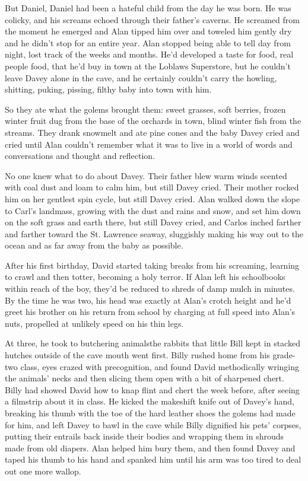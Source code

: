 But Daniel, Daniel had been a hateful child from the day he was born. 
He was colicky, and his screams echoed through their father's caverns. 
He screamed from the moment he emerged and Alan tipped him over and
toweled him gently dry and he didn't stop for an entire year.  Alan
stopped being able to tell day from night, lost track of the weeks and
months.  He'd developed a taste for food, real people food, that he'd
buy in town at the Loblaws Superstore, but he couldn't leave Davey
alone in the cave, and he certainly couldn't carry the howling,
shitting, puking, pissing, filthy baby into town with him.

So they ate what the golems brought them:  sweet grasses, soft
berries, frozen winter fruit dug from the base of the orchards in
town, blind winter fish from the streams.  They drank snowmelt and ate
pine cones and the baby Davey cried and cried until Alan couldn't
remember what it was to live in a world of words and conversations and
thought and reflection.

No one knew what to do about Davey.  Their father blew warm winds
scented with coal dust and loam to calm him, but still Davey cried. 
Their mother rocked him on her gentlest spin cycle, but still Davey
cried.  Alan walked down the slope to Carl's landmass, growing with
the dust and rains and snow, and set him down on the soft grass and
earth there, but still Davey cried, and Carlos inched farther and
farther toward the St.  Lawrence seaway, sluggishly making his way out
to the ocean and as far away from the baby as possible.

After his first birthday, David started taking breaks from his
screaming, learning to crawl and then totter, becoming a holy terror. 
If Alan left his schoolbooks within reach of the boy, they'd be
reduced to shreds of damp mulch in minutes.  By the time he was two,
his head was exactly at Alan's crotch height and he'd greet his
brother on his return from school by charging at full speed into
Alan's nuts, propelled at unlikely speed on his thin legs.

At three, he took to butchering animals\dash{}the rabbits that little Bill
kept in stacked hutches outside of the cave mouth went first.  Billy
rushed home from his grade-two class, eyes crazed with precognition,
and found David methodically wringing the animals' necks and then
slicing them open with a bit of sharpened chert.  Billy had showed
David how to knap flint and chert the week before, after seeing a
filmstrip about it in class.  He kicked the makeshift knife out of
Davey's hand, breaking his thumb with the toe of the hard leather
shoes the golems had made for him, and left Davey to bawl in the cave
while Billy dignified his pets' corpses, putting their entrails back
inside their bodies and wrapping them in shrouds made from old
diapers.  Alan helped him bury them, and then found Davey and taped
his thumb to his hand and spanked him until his arm was too tired to
deal out one more wallop.


